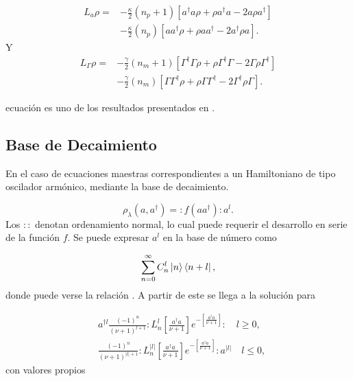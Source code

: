 \documentclass[10pt,a4paper]{report}
\begin{document}

\begin{align}
L_a \rho =& - \frac{\kappa}{2}(n_p + 1)[a^\dagger a\rho + \rho a^\dagger a -2a\rho a^\dagger]  \\
 &- \frac{\kappa}{2}(n_p)[ aa^\dagger\rho + \rho  aa^\dagger -2a^\dagger\rho a].\nonumber
\end{align}
 Y 
\begin{align}
L_\Gamma \rho =& - \frac{\gamma}{2}(n_m + 1)[\Gamma^\dagger \Gamma\rho + \rho \Gamma^\dagger \Gamma -2\Gamma\rho \Gamma^\dagger]  \\
 &- \frac{\gamma}{2}(n_m)[ \Gamma\Gamma^\dagger\rho + \rho  \Gamma\Gamma^\dagger -2\Gamma^\dagger\rho \Gamma].\nonumber
\end{align} 

 ecuación
es uno de los resultados presentados en \cite{YanesOC}.

\subsection{Base de Decaimiento}

En el caso de ecuaciones maestras correspondientes a un Hamiltoniano
de tipo oscilador armónico,  mediante la base de decaimiento\cite{EnglertDB}.

\begin{equation}\label{Englert1993}
\rho_\lambda (a,a^\dagger) = :f(aa^\dagger):a^l.
\end{equation} Los $::$ denotan ordenamiento normal, lo cual puede requerir el desarrollo en serie de la función $f$. Se puede expresar $a^l$ en la base de número como

\begin{equation}
\sum_{n=0}^\infty C_n^l\Ket{n}\Bra{n+l},
\end{equation}
donde puede verse la relación .
A partir de este se llega a la solución para 
\cite{EnglertDB}

\begin{align}\label{DefDB}
&a^{\dagger l}\frac{(-1)^n}{(\nu+1)^{l+1}}:L_n^l[\frac{a^\dagger a}{\nu+1}]e^{-[\frac{a^\dagger a}{\nu+1}]}:\quad l \geq 0, \\
&\frac{(-1)^n}{(\nu+1)^{|l|+1}}:L_n^{|l|}[\frac{a^\dagger a}{\nu+1}]e^{-[\frac{a^\dagger a}{\nu+1}]}:a^{|l|}\quad l \leq 0,
\end{align} con valores propios
\end{document}

